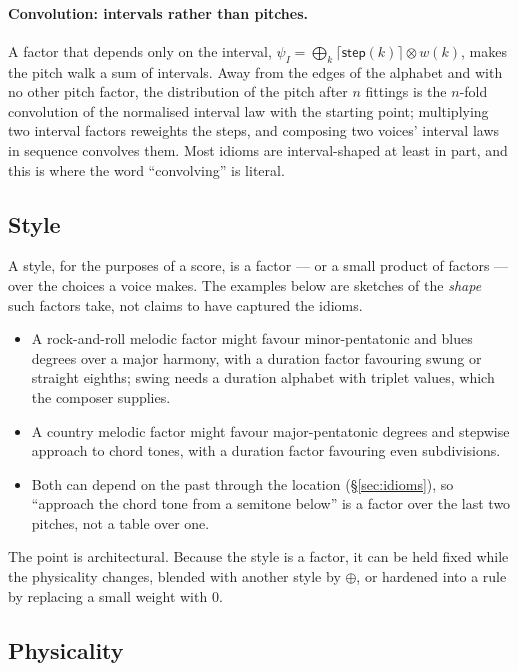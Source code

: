 \documentclass[11pt,a4paper]{article}
\theoremstyle{plain}
\theoremstyle{definition}
\theoremstyle{remark}
\newcommand{\tensorv}{\otimes}
\newcommand{\sumv}{\oplus}
\newcommand{\crisp}[1]{\lceil #1 \rceil}
\newcommand{\atm}[1]{\mathsf{#1}}
\begin{document}
\paragraph{Convolution: intervals rather than pitches.}
A factor that depends only on the interval,
$\psi_I = \bigoplus_k \crisp{\atm{step}(k)} \tensorv w(k)$, makes the pitch
walk a sum of intervals. Away from the edges of the alphabet and with no other
pitch factor, the distribution of the pitch after $n$ fittings is the $n$-fold
convolution of the normalised interval law with the starting point; multiplying
two interval factors reweights the steps, and composing two voices' interval
laws in sequence convolves them. Most idioms are interval-shaped at least in
part, and this is where the word ``convolving'' is literal.

\subsection{Style}

A style, for the purposes of a score, is a factor --- or a small product of
factors --- over the choices a voice makes. The examples below are sketches of
the \emph{shape} such factors take, not claims to have captured the idioms.
\begin{itemize}[leftmargin=*,itemsep=2pt]
\item A rock-and-roll melodic factor might favour minor-pentatonic and blues
  degrees over a major harmony, with a duration factor favouring swung or
  straight eighths; swing needs a duration alphabet with triplet values, which
  the composer supplies.
\item A country melodic factor might favour major-pentatonic degrees and
  stepwise approach to chord tones, with a duration factor favouring even
  subdivisions.
\item Both can depend on the past through the location
  (\S\ref{sec:idioms}), so ``approach the chord tone from a semitone below'' is
  a factor over the last two pitches, not a table over one.
\end{itemize}
The point is architectural. Because the style is a factor, it can be held fixed
while the physicality changes, blended with another style by $\sumv$, or
hardened into a rule by replacing a small weight with $0$.

\subsection{Physicality}\label{ssec:physical}
\end{document}
